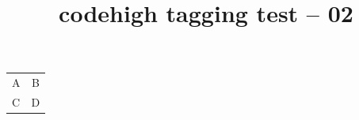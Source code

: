 \documentclass{article}
\title{codehigh tagging test -- 02}
\begin{document}
\begin{demohigh}[language=latex/table]
\begin{tabular}{lc}
A & B \\
C & D
\end{tabular}
\end{demohigh}
\end{document}
